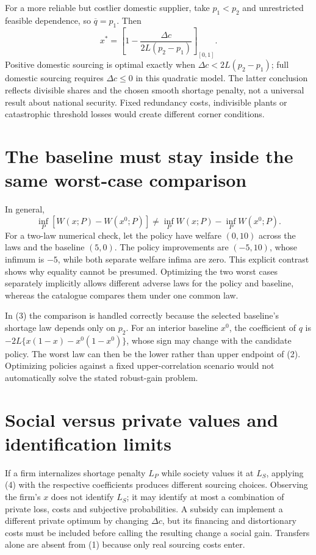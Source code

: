 \documentclass[11pt,a4paper]{article}
\begin{document}
For a more reliable but costlier domestic supplier, take $p_1<p_2$ and unrestricted feasible dependence, so $\overline q=p_1$. Then
\[
 x^*=\left[1-\frac{\Delta c}{2L(p_2-p_1)}\right]_{[0,1]}.
\]
Positive domestic sourcing is optimal exactly when $\Delta c<2L(p_2-p_1)$; full domestic sourcing requires $\Delta c\le0$ in this quadratic model. The latter conclusion reflects divisible shares and the chosen smooth shortage penalty, not a universal result about national security. Fixed redundancy costs, indivisible plants or catastrophic threshold losses would create different corner conditions.

\section{The baseline must stay inside the same worst-case comparison}
In general,
\[
 \inf_P[W(x;P)-W(x^0;P)]\ne
 \inf_P W(x;P)-\inf_P W(x^0;P).                           \tag{6}
\]
For a two-law numerical check, let the policy have welfare $(0,10)$ across the laws and the baseline $(5,0)$. The policy improvements are $(-5,10)$, whose infimum is $-5$, while both separate welfare infima are zero. This explicit contrast shows why equality cannot be presumed. Optimizing the two worst cases separately implicitly allows different adverse laws for the policy and baseline, whereas the catalogue compares them under one common law.

In (3) the comparison is handled correctly because the selected baseline's shortage law depends only on $p_2$. For an interior baseline $x^0$, the coefficient of $q$ is
$-2L\{x(1-x)-x^0(1-x^0)\}$, whose sign may change with the candidate policy. The worst law can then be the lower rather than upper endpoint of (2). Optimizing policies against a fixed upper-correlation scenario would not automatically solve the stated robust-gain problem.

\section{Social versus private values and identification limits}
If a firm internalizes shortage penalty $L_P$ while society values it at $L_S$, applying (4) with the respective coefficients produces different sourcing choices. Observing the firm's $x$ does not identify $L_S$; it may identify at most a combination of private loss, costs and subjective probabilities. A subsidy can implement a different private optimum by changing $\Delta c$, but its financing and distortionary costs must be included before calling the resulting change a social gain. Transfers alone are absent from (1) because only real sourcing costs enter.
\end{document}
